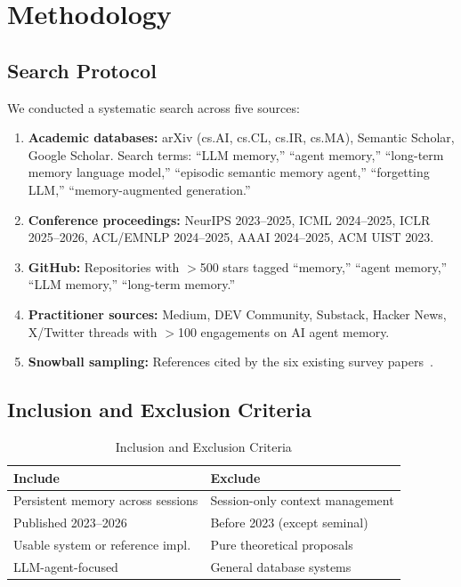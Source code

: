 \section{Methodology}
\label{sec:methodology}


\subsection{Search Protocol}

We conducted a systematic search across five sources:

\begin{enumerate}[leftmargin=*, nosep]
    \item \textbf{Academic databases:} arXiv (cs.AI, cs.CL, cs.IR,
    cs.MA), Semantic Scholar, Google Scholar. Search terms:
    ``LLM memory,'' ``agent memory,'' ``long-term memory language
    model,'' ``episodic semantic memory agent,'' ``forgetting LLM,''
    ``memory-augmented generation.''
    \item \textbf{Conference proceedings:} NeurIPS 2023--2025, ICML
    2024--2025, ICLR 2025--2026, ACL/EMNLP 2024--2025, AAAI 2024--2025,
    ACM UIST 2023.
    \item \textbf{GitHub:} Repositories with $>$500 stars tagged
    ``memory,'' ``agent memory,'' ``LLM memory,'' ``long-term memory.''
    \item \textbf{Practitioner sources:} Medium, DEV Community, Substack,
    Hacker News, X/Twitter threads with $>$100 engagements on AI
    agent memory.
    \item \textbf{Snowball sampling:} References cited by the six
    existing survey papers~\cite{sumers2024coala, gao2023rag,
    zhang2024survey, hu2025memory, wu2025memory, du2025memory}.
\end{enumerate}

\subsection{Inclusion and Exclusion Criteria}

\begin{table}[htbp]
\centering
\caption{Inclusion and Exclusion Criteria}
\label{tab:criteria}
\begin{tabular}{@{}ll@{}}
\toprule
\textbf{Include} & \textbf{Exclude} \\
\midrule
Persistent memory across sessions & Session-only context management \\
Published 2023--2026 & Before 2023 (except seminal) \\
Usable system or reference impl. & Pure theoretical proposals \\
LLM-agent-focused & General database systems \\
\bottomrule
\end{tabular}
\end{table}


